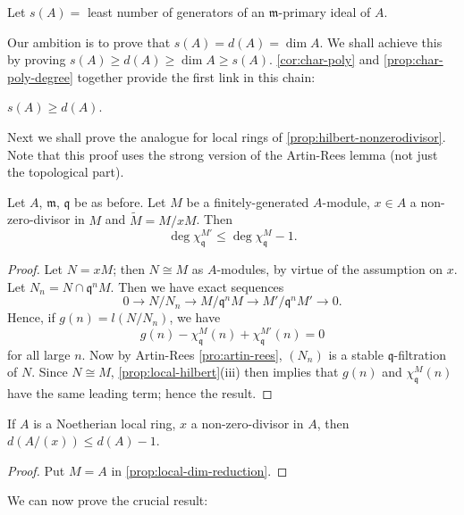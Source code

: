 Let $s(A) = $ least number of generators of an $\mathfrak{m}$-primary ideal of $A$.

Our ambition is to prove that $s(A) = d(A) = \dim A$. We shall achieve this by proving $s(A) \geq d(A) \geq \dim A \geq s(A)$. \eqref{cor:char-poly} and \eqref{prop:char-poly-degree} together provide the first link in this chain:

\begin{proposition}\label{prop:s-geq-d}
$s(A) \geq d(A)$.
\end{proposition}

Next we shall prove the analogue for local rings of \eqref{prop:hilbert-nonzerodivisor}. Note that this proof uses the strong version of the Artin-Rees lemma (not just the topological part).

\begin{proposition}\label{prop:local-dim-reduction}
Let $A$, $\mathfrak{m}$, $\mathfrak{q}$ be as before. Let $M$ be a finitely-generated $A$-module, $x \in A$ a non-zero-divisor in $M$ and $\tilde{M} = M/xM$. Then
\[
    \deg \chi_{\mathfrak{q}}^{M'} \leq \deg \chi_{\mathfrak{q}}^M - 1.
\]
\end{proposition}

\begin{proof}
Let $N = xM$; then $N \cong M$ as $A$-modules, by virtue of the assumption on $x$. Let $N_n = N \cap \mathfrak{q}^n M$. Then we have exact sequences
\[
    0 \longrightarrow N/N_n \longrightarrow M/\mathfrak{q}^n M \longrightarrow M'/\mathfrak{q}^n M' \longrightarrow 0.
\]
Hence, if $g(n) = l(N/N_n)$, we have
\[
    g(n) - \chi_{\mathfrak{q}}^M(n) + \chi_{\mathfrak{q}}^{M'}(n) = 0
\]
for all large $n$. Now by Artin-Rees \eqref{pro:artin-rees}, $(N_n)$ is a stable $\mathfrak{q}$-filtration of $N$. Since $N \cong M$, \eqref{prop:local-hilbert}(iii) then implies that $g(n)$ and $\chi_{\mathfrak{q}}^M(n)$ have the same leading term; hence the result.
\end{proof}

\begin{corollary}\label{cor:d-quotient}
If $A$ is a Noetherian local ring, $x$ a non-zero-divisor in $A$, then $d(A/(x)) \leq d(A) - 1$.
\end{corollary}

\begin{proof}
Put $M = A$ in \eqref{prop:local-dim-reduction}.
\end{proof}

We can now prove the crucial result:

